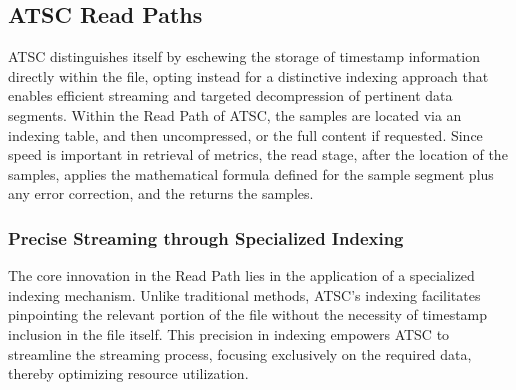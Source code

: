 \documentclass[conference]{IEEEtran}
\begin{document}
\subsection{ATSC Read Paths}

ATSC distinguishes itself by eschewing the storage of timestamp information directly within the file, opting instead for a distinctive indexing approach that enables efficient streaming and targeted decompression of pertinent data segments.
Within the Read Path of ATSC, the samples are located via an indexing table, and then uncompressed, or the full content if requested. 
Since speed is important in retrieval of metrics, the read stage, after the location of the samples, applies the mathematical formula defined for the sample segment plus any error correction, and the returns the samples. 

\vspace{10pt}
\subsubsection{Precise Streaming through Specialized Indexing}\label{SCMA}
The core innovation in the Read Path lies in the application of a specialized indexing mechanism. Unlike traditional methods, ATSC's indexing facilitates pinpointing the relevant portion of the file without the necessity of timestamp inclusion in the file itself. This precision in indexing empowers ATSC to streamline the streaming process, focusing exclusively on the required data, thereby optimizing resource utilization. 

\vspace{10pt}
\end{document}
